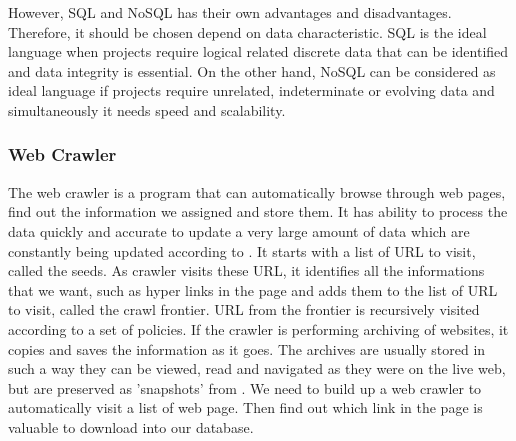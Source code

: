However, SQL and NoSQL has their own advantages and disadvantages.
Therefore, it should be chosen depend on data characteristic.
SQL is the ideal language when projects require logical related discrete data that can be identified and data integrity is essential.
On the other hand, NoSQL can be considered as ideal language if projects require unrelated, indeterminate or evolving data and simultaneously it needs speed and scalability.
	
\subsubsection{Web Crawler}
The web crawler is a program that can automatically browse through web pages, find out the information we assigned and store them.
It has ability to process the data quickly and accurate to update a very large amount of data which are constantly being updated according to \cite{Liu2012}.
It starts with a list of URL to visit, called the seeds.
As crawler visits these URL, it identifies all the informations that we want, such as hyper links in the page and adds them to the list of URL to visit, called the crawl frontier.
URL from the frontier is recursively visited according to a set of policies.
If the crawler is performing archiving of websites, it copies and saves the information as it goes.
The archives are usually stored in such a way they can be viewed, read and navigated as they were on the live web, but are preserved as 'snapshots' from \cite{Du2013}.
We need to build up a web crawler to automatically visit a list of web page.
Then find out which link in the page is valuable to download into our database.

\newpage %
